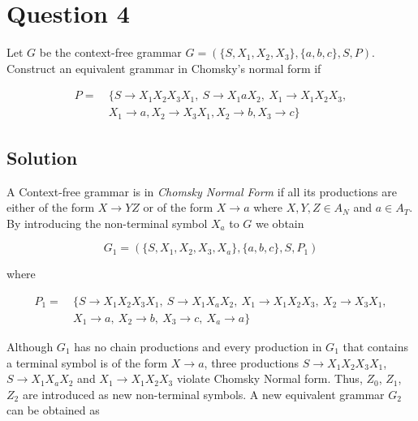 
\section*{Question 4}

Let $ G $ be the context-free grammar $G = (\{S,X_1,X_2,X_3\},\{a,b,c\},S,P)$.
Construct an equivalent grammar in Chomsky's normal form if

\begin{equation}
\begin{aligned}
P =\ & \{ S\rightarrow X_1 X_2 X_3 X_1,\ S\rightarrow X_1 a X_2,\ X_1 \rightarrow X_1 X_2 X_3,\\
& X_1 \rightarrow a, X_2 \rightarrow X_3 X_1, X_2 \rightarrow b, X_3 \rightarrow c\}
\end{aligned}
\end{equation}

\subsection*{Solution}

A Context-free grammar is in \textit{Chomsky Normal Form} if all its productions are either of the form $X\rightarrow YZ$ or of the form $X\rightarrow a$ where $X,Y,Z \in A_N$ and $a\in A_T$.
By introducing the non-terminal symbol $X_a$ to $G$ we obtain

\begin{equation}
G_1 = (\{S, X_1, X_2, X_3, X_a\},\{a, b, c\},S,P_1)
\end{equation}

where

\begin{equation}
\begin{aligned}
P_1 =\ & \{ S\rightarrow X_1 X_2 X_3 X_1,\ S\rightarrow X_1 X_a X_2,\ X_1 \rightarrow X_1 X_2 X_3,\ X_2 \rightarrow X_3 X_1,\\
& X_1 \rightarrow a,\ X_2 \rightarrow b,\ X_3 \rightarrow c,\ X_a \rightarrow a\}
\end{aligned}
\end{equation}

Although $G_1$ has no chain productions and every production in $G_1$ that contains a terminal symbol is of the form $X\rightarrow a$, three productions $S\rightarrow X_1 X_2 X_3 X_1$, $S\rightarrow X_1 X_a X_2$ and $X_1 \rightarrow X_1 X_2 X_3$ violate Chomsky Normal form.
Thus, $Z_0$, $Z_1$, $Z_2$ are introduced as new non-terminal symbols.
A new equivalent grammar $G_2$ can be obtained as

